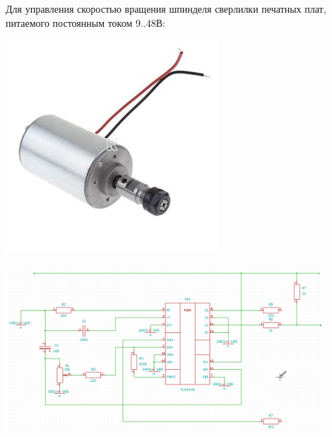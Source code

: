 
Для управления скоростью вращения шпинделя сверлилки печатных плат,
питаемого постоянным током 9..48В:

\includegraphics[height=0.7\textheight]{SpindleDriver/spindle.jpeg}

\includegraphics[width=0.9\textwidth]{SpindleDriver/scheme.png}
